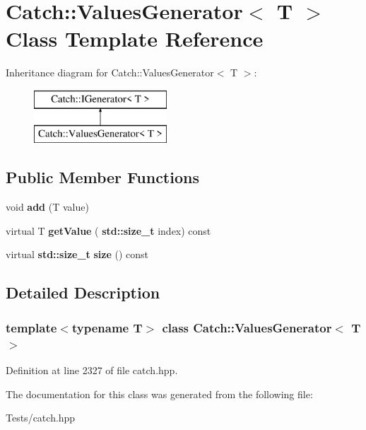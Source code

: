 \hypertarget{class_catch_1_1_values_generator}{}\section{Catch\+:\+:Values\+Generator$<$ T $>$ Class Template Reference}
\label{class_catch_1_1_values_generator}
Inheritance diagram for Catch\+:\+:Values\+Generator$<$ T $>$\+:\begin{figure}[H]
\begin{center}
\leavevmode
\includegraphics[height=2.000000cm]{class_catch_1_1_values_generator}
\end{center}
\end{figure}
\subsection*{Public Member Functions}
\begin{DoxyCompactItemize}
\item 
\mbox{\label{class_catch_1_1_values_generator_a8412c8ce5d9d4fc6ff06d5246d56d538}} 
void {\bfseries add} (T value)
\item 
\mbox{\label{class_catch_1_1_values_generator_a9674c8b70d562d2d68154de92dd1810a}} 
virtual T {\bfseries get\+Value} (\textbf{ std\+::size\+\_\+t} index) const
\item 
\mbox{\label{class_catch_1_1_values_generator_a9aa5b140ee502975cf35115e534ab771}} 
virtual \textbf{ std\+::size\+\_\+t} {\bfseries size} () const
\end{DoxyCompactItemize}


\subsection{Detailed Description}
\subsubsection*{template$<$typename T$>$\newline
class Catch\+::\+Values\+Generator$<$ T $>$}



Definition at line 2327 of file catch.\+hpp.



The documentation for this class was generated from the following file\+:\begin{DoxyCompactItemize}
\item 
Tests/catch.\+hpp\end{DoxyCompactItemize}

